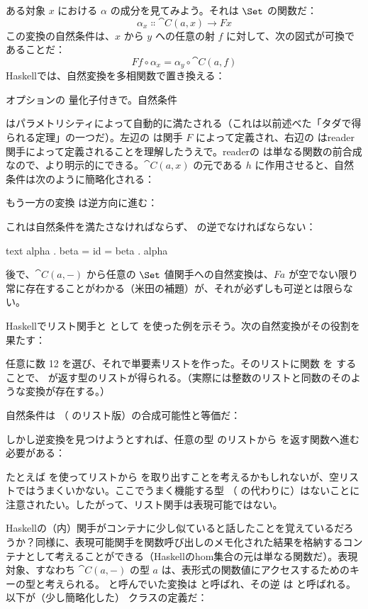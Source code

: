 ある対象 $x$ における $\alpha$ の成分を見てみよう。それは $\Set$ の関数だ：
\[\alpha_x \Colon \cat{C}(a, x) \to F x\]
この変換の自然条件は、$x$ から $y$ への任意の射 $f$ に対して、次の図式が可換であることだ：
\[F f \circ \alpha_x = \alpha_y \circ \cat{C}(a, f)\]
Haskellでは、自然変換を多相関数で置き換える：

オプションの  量化子付きで。自然条件

はパラメトリシティによって自動的に満たされる（これは以前述べた「タダで得られる定理」の一つだ）。左辺の  は関手 $F$ によって定義され、右辺の  はreader関手によって定義されることを理解したうえで。readerの  は単なる関数の前合成なので、より明示的にできる。$\cat{C}(a, x)$ の元である $h$ に作用させると、自然条件は次のように簡略化される：

もう一方の変換  は逆方向に進む：

これは自然条件を満たさなければならず、 の逆でなければならない：

\begin{snip}{text}
alpha . beta = id = beta . alpha
\end{snip}
後で、$\cat{C}(a, -)$ から任意の $\Set$ 値関手への自然変換は、$F a$ が空でない限り常に存在することがわかる（米田の補題）が、それが必ずしも可逆とは限らない。

Haskellでリスト関手と  として  を使った例を示そう。次の自然変換がその役割を果たす：

任意に数 12 を選び、それで単要素リストを作った。そのリストに関数  を  することで、 が返す型のリストが得られる。（実際には整数のリストと同数のそのような変換が存在する。）

自然条件は （ のリスト版）の合成可能性と等価だ：

しかし逆変換を見つけようとすれば、任意の型  のリストから  を返す関数へ進む必要がある：

たとえば  を使ってリストから  を取り出すことを考えるかもしれないが、空リストではうまくいかない。ここでうまく機能する型 （ の代わりに）はないことに注意されたい。したがって、リスト関手は表現可能ではない。

Haskellの（内）関手がコンテナに少し似ていると話したことを覚えているだろうか？同様に、表現可能関手を関数呼び出しのメモ化された結果を格納するコンテナとして考えることができる（Haskellのhom集合の元は単なる関数だ）。表現対象、すなわち $\cat{C}(a, -)$ の型 $a$ は、表形式の関数値にアクセスするためのキーの型と考えられる。 と呼んでいた変換は  と呼ばれ、その逆  は  と呼ばれる。以下が（少し簡略化した） クラスの定義だ：


